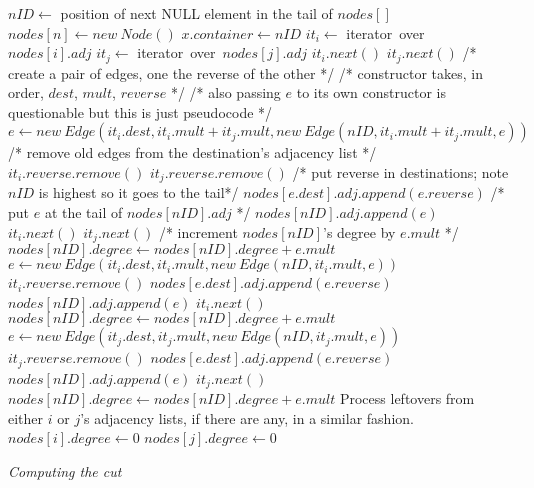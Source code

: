 \documentclass[a4paper]{article}
\begin{document}
\begin{algorithmic}
\State $nID \gets$ position of next NULL element in the tail of $nodes[]$
\State $nodes[n] \gets new\ Node()$
		\State $x.container \gets nID$
	\EndIf
\EndFor
\State $it_i \gets$ iterator\ over\ $nodes[i].adj$
\State $it_j \gets$ iterator\ over\ $nodes[j].adj$
		\State $it_i.next()$
		\State $it_j.next()$
		\State /* create a pair of edges, one the reverse of the other */
		\State /* constructor takes, in order, $dest$, $mult$, $reverse$ */
		\State /* also passing $e$ to its own constructor is questionable but this is just pseudocode */
		\State $e \gets new\ Edge(it_i.dest, it_i.mult+it_j.mult, new\ Edge(nID, it_i.mult+it_j.mult, e))$
		\State /* remove old edges from the destination's adjacency list */
		\State $it_i.reverse.remove()$
		\State $it_j.reverse.remove()$
		\State /* put reverse in destinations; note $nID$ is highest so it goes to the tail*/
		\State $nodes[e.dest].adj.append(e.reverse)$
		\State /* put $e$ at the tail of $nodes[nID].adj$ */
		\State $nodes[nID].adj.append(e)$
		\State $it_i.next()$
		\State $it_j.next()$
		\State /* increment $nodes[nID]$'s degree by $e.mult$ */
		\State $nodes[nID].degree \gets nodes[nID].degree + e.mult$
		\State $e \gets new\ Edge(it_i.dest, it_i.mult, new\ Edge(nID, it_i.mult, e))$
		\State $it_i.reverse.remove()$
		\State $nodes[e.dest].adj.append(e.reverse)$
		\State $nodes[nID].adj.append(e)$
		\State $it_i.next()$
		\State $nodes[nID].degree \gets nodes[nID].degree + e.mult$
	\Else {}
		\State $e \gets new\ Edge(it_j.dest, it_j.mult, new\ Edge(nID, it_j.mult, e))$
		\State $it_j.reverse.remove()$
		\State $nodes[e.dest].adj.append(e.reverse)$
		\State $nodes[nID].adj.append(e)$
		\State $it_j.next()$	
		\State $nodes[nID].degree \gets nodes[nID].degree + e.mult$
	\EndIf
\EndWhile
\State Process leftovers from either $i$ or $j$'s adjacency lists, if there are any, in a similar fashion.
\State $nodes[i].degree \gets 0$ 
\State $nodes[j].degree \gets 0$ 
\EndFunction
\end{algorithmic}
\hfill

\noindent
\textit{Computing the cut}
\end{document}
